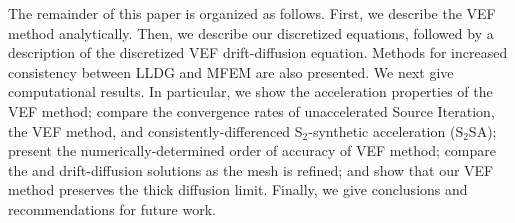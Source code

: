 The remainder of this paper is organized as follows.  First, we describe the VEF method analytically. Then, we describe 
our discretized \SN equations, followed by a description of the discretized VEF drift-diffusion equation. Methods for increased 
consistency between LLDG and MFEM are also presented. We next give computational results.  In particular, we show the acceleration properties of the VEF method; compare the convergence rates of unaccelerated Source Iteration, the VEF method, and consistently-differenced S$_2$-synthetic acceleration (S$_2$SA); present the numerically-determined order of accuracy of  VEF method; compare the \SN and drift-diffusion solutions as the mesh is refined; and show that our VEF method preserves the thick diffusion limit. Finally, we give conclusions and recommendations for future work. 

